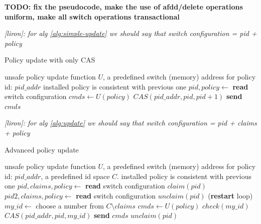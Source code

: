 \documentclass[conference]{sigcomm-alternate}
\newcommand{\claimcheck}{check\xspace}
\newcommand{\liron}[1]{\textit{\textcolor{mygreen}{[liron]: #1}}} %
\begin{document}
\textbf{TODO: fix the pseudocode, make the use of afdd/delete
  operations uniform, make all switch operations transactional}

\liron{for alg \ref{alg:simple-update} we should say that switch configuration = pid + policy}

\begin{algorithm}[t]
    \caption{Policy update with only CAS}
    \label{alg:simple-update}
    \begin{algorithmic}[1]
    \Require unsafe policy update function $U$, a predefined switch (memory) address for policy id: $pid\_addr$
    \Ensure installed policy is consistent with previous one
 		\Repeat
 			\State $pid,policy\gets$ \textbf{read} switch configuration
 			\State $cmds\gets U(policy)$
 			\startTxn
	 			\State $CAS(pid\_addr,pid,pid+1)$
	 			\State \textbf{send} $cmds$ %
 			\endTxn
			\Return

    \end{algorithmic}
\end{algorithm}


\liron{for alg \ref{alg:update} we should say that switch configuration = pid + claims + policy}

\begin{algorithm}[t]
    \caption{Advanced policy update}
    \label{alg:update}
    \begin{algorithmic}[1]
        \Require unsafe policy update function $U$, a predefined switch (memory) address for policy id: $pid\_addr$, a predefined id space $C$.
    \Ensure installed policy is consistent with previous one
 		\Repeat
		 	\State $pid,claims,policy\gets$ \textbf{read} switch configuration
 			\State $claim(pid)$
 			\State $pid2,claims,policy\gets$ \textbf{read} switch configuration
	 			\State $unclaim(pid)$
 				 (\textbf{restart} loop)
 			\EndIf
 			\State $my\_id\gets$ choose a number from $C\setminus claims$
 			\State $cmds\gets U(policy)$
 			\startTxn
 				\State $\claimcheck(my\_id)$
	 			\State $CAS(pid\_addr, pid,my\_id)$
	 			\State \textbf{send} $cmds$ %
 			\endTxn
	 		\State $unclaim(pid)$
			\Return

    \end{algorithmic}
\end{algorithm}
\end{document}
